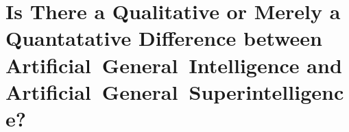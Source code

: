 \section{Is There a Qualitative or Merely a Quantatative Difference between Artificial~General~Intelligence and Artificial~General~Superintelligence?}
